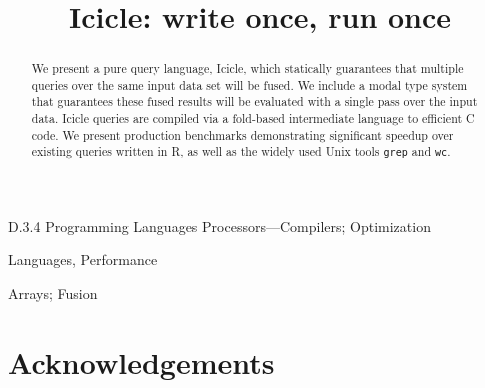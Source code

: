 \documentclass[preprint]{sigplanconf}
\begin{document}
\doi{}

\title{Icicle: write once, run once}


\maketitle
\makeatactive

\begin{abstract}
We present a pure query language, Icicle, which statically guarantees that multiple queries over the same input data set will be fused. We include a modal type system that guarantees these fused results will be evaluated with a single pass over the input data. Icicle queries are compiled via a fold-based intermediate language to efficient C code. We present production benchmarks demonstrating significant speedup over existing queries written in R, as well as the widely used Unix tools \texttt{grep} and \texttt{wc}.

\end{abstract}


\category
	{D.3.4}
	{Programming Languages}
	{Processors---Compilers; Optimization}

\terms
	Languages, Performance

\keywords
	Arrays; Fusion






% 


\section*{Acknowledgements}



\end{document}

